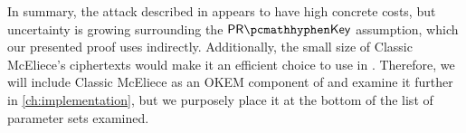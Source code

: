 In summary, the attack described in \cite{cryptoeprint:2024/1193} appears to have high concrete costs, but uncertainty is growing surrounding the $\prkey$ assumption, which our presented proof uses indirectly. Additionally, the small size of Classic McEliece's ciphertexts would make it an efficient choice to use in \drivel{}.
Therefore, we will include Classic McEliece as an OKEM component of \drivel{} and examine it further in \cref{ch:implementation}, but we purposely place it at the bottom of the list of parameter sets examined.
